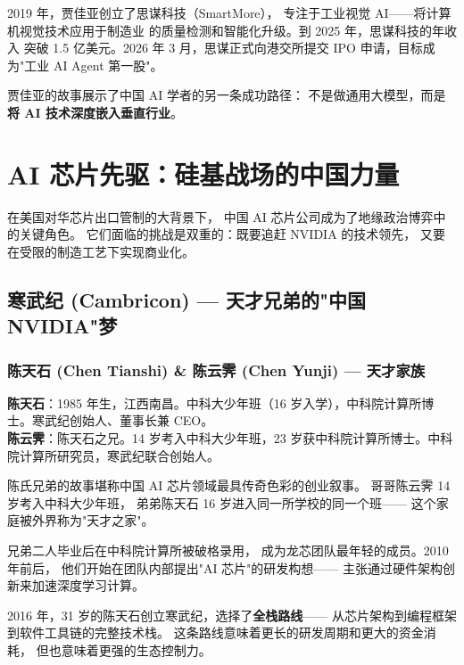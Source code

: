 2019 年，贾佳亚创立了思谋科技（SmartMore），
专注于工业视觉 AI——将计算机视觉技术应用于制造业
的质量检测和智能化升级。到 2025 年，思谋科技的年收入
突破 1.5 亿美元。2026 年 3 月，思谋正式向港交所提交
IPO 申请，目标成为"工业 AI Agent 第一股"。

贾佳亚的故事展示了中国 AI 学者的另一条成功路径：
不是做通用大模型，而是\textbf{将 AI 技术深度嵌入垂直行业}。



\section{AI 芯片先驱：硅基战场的中国力量}
\label{sec:chips}

在美国对华芯片出口管制的大背景下，
中国 AI 芯片公司成为了地缘政治博弈中的关键角色。
它们面临的挑战是双重的：既要追赶 NVIDIA 的技术领先，
又要在受限的制造工艺下实现商业化。


\subsection{寒武纪 (Cambricon) — 天才兄弟的"中国 NVIDIA"梦}

\subsubsection{陈天石 (Chen Tianshi) \& 陈云霁 (Chen Yunji) — 天才家族}

\begin{keybox}
\textbf{陈天石}：1985 年生，江西南昌。中科大少年班（16 岁入学），中科院计算所博士。寒武纪创始人、董事长兼 CEO。\\
\textbf{陈云霁}：陈天石之兄。14 岁考入中科大少年班，23 岁获中科院计算所博士。中科院计算所研究员，寒武纪联合创始人。
\end{keybox}

陈氏兄弟的故事堪称中国 AI 芯片领域最具传奇色彩的创业叙事。
哥哥陈云霁 14 岁考入中科大少年班，
弟弟陈天石 16 岁进入同一所学校的同一个班——
这个家庭被外界称为"天才之家"。

兄弟二人毕业后在中科院计算所被破格录用，
成为龙芯团队最年轻的成员。2010 年前后，
他们开始在团队内部提出"AI 芯片"的研发构想——
主张通过硬件架构创新来加速深度学习计算。

2016 年，31 岁的陈天石创立寒武纪，选择了\textbf{全栈路线}——
从芯片架构到编程框架到软件工具链的完整技术栈。
这条路线意味着更长的研发周期和更大的资金消耗，
但也意味着更强的生态控制力。

